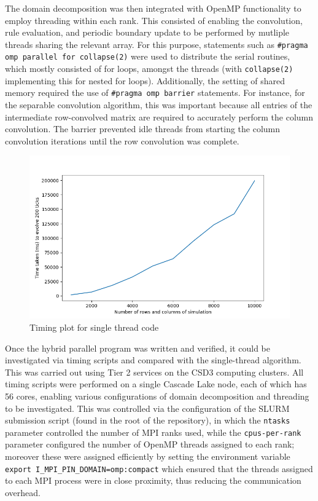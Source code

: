 \documentclass[12pt]{article}
\begin{document}
The domain decomposition was then integrated with OpenMP functionality to employ threading within each rank.
This consisted of enabling the convolution, rule evaluation, and periodic boundary update to be performed by mutliple threads sharing the relevant array.
For this purpose, statements such as \texttt{\#pragma omp parallel for collapse(2)} were used to distribute the serial routines,
which mostly consisted of for loops, amongst the threads (with \texttt{collapse(2)} implementing this for nested for loops).
Additionally, the setting of shared memory required the use of \texttt{\#pragma omp barrier} statements.
For instance, for the separable convolution algorithm, this was important because all entries of the intermediate row-convolved matrix are required to accurately perform the column convolution.
The barrier prevented idle threads from starting the column convolution iterations until the row convolution was complete.

\begin{figure}[hp]
    \includegraphics[scale=0.65, center]{figures/time_simulation.png}
    \caption{Timing plot for single thread code}
    \label{fig:time_single}
\end{figure}

Once the hybrid parallel program was written and verified, it could be investigated via timing scripts and compared with the single-thread algorithm.
This was carried out using Tier 2 services on the CSD3 computing clusters.
All timing scripts were performed on a single Cascade Lake node, each of which has 56 cores,
enabling various configurations of domain decomposition and threading to be investigated.
This was controlled via the configuration of the SLURM submission script (found in the root of the repository),
in which the \texttt{ntasks} parameter controlled the number of MPI ranks used,
while the \texttt{cpus-per-rank} parameter configured the number of OpenMP threads assigned to each rank;
moreover these were assigned efficiently by setting the environment variable \texttt{export I\_MPI\_PIN\_DOMAIN=omp:compact} which ensured that the threads assigned to each MPI process were in close proximity,
thus reducing the communication overhead.
\end{document}
